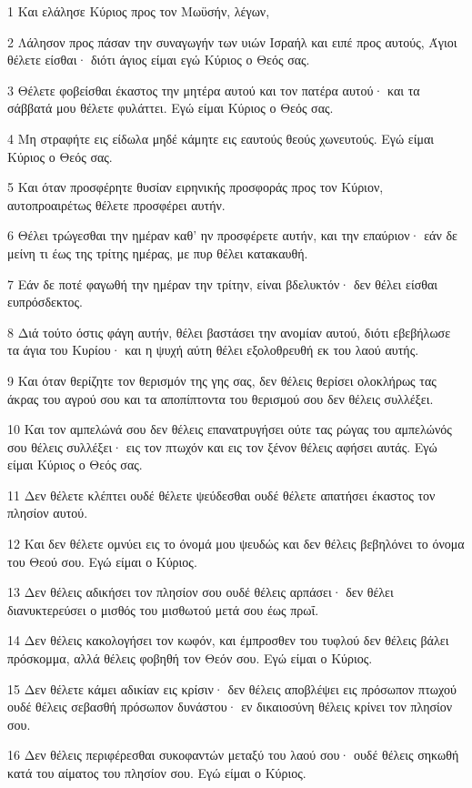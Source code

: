 \par 1 Και ελάλησε Κύριος προς τον Μωϋσήν, λέγων,
\par 2 Λάλησον προς πάσαν την συναγωγήν των υιών Ισραήλ και ειπέ προς αυτούς, Άγιοι θέλετε είσθαι· διότι άγιος είμαι εγώ Κύριος ο Θεός σας.
\par 3 Θέλετε φοβείσθαι έκαστος την μητέρα αυτού και τον πατέρα αυτού· και τα σάββατά μου θέλετε φυλάττει. Εγώ είμαι Κύριος ο Θεός σας.
\par 4 Μη στραφήτε εις είδωλα μηδέ κάμητε εις εαυτούς θεούς χωνευτούς. Εγώ είμαι Κύριος ο Θεός σας.
\par 5 Και όταν προσφέρητε θυσίαν ειρηνικής προσφοράς προς τον Κύριον, αυτοπροαιρέτως θέλετε προσφέρει αυτήν.
\par 6 Θέλει τρώγεσθαι την ημέραν καθ' ην προσφέρετε αυτήν, και την επαύριον· εάν δε μείνη τι έως της τρίτης ημέρας, με πυρ θέλει κατακαυθή.
\par 7 Εάν δε ποτέ φαγωθή την ημέραν την τρίτην, είναι βδελυκτόν· δεν θέλει είσθαι ευπρόσδεκτος.
\par 8 Διά τούτο όστις φάγη αυτήν, θέλει βαστάσει την ανομίαν αυτού, διότι εβεβήλωσε τα άγια του Κυρίου· και η ψυχή αύτη θέλει εξολοθρευθή εκ του λαού αυτής.
\par 9 Και όταν θερίζητε τον θερισμόν της γης σας, δεν θέλεις θερίσει ολοκλήρως τας άκρας του αγρού σου και τα αποπίπτοντα του θερισμού σου δεν θέλεις συλλέξει.
\par 10 Και τον αμπελώνά σου δεν θέλεις επανατρυγήσει ούτε τας ρώγας του αμπελώνός σου θέλεις συλλέξει· εις τον πτωχόν και εις τον ξένον θέλεις αφήσει αυτάς. Εγώ είμαι Κύριος ο Θεός σας.
\par 11 Δεν θέλετε κλέπτει ουδέ θέλετε ψεύδεσθαι ουδέ θέλετε απατήσει έκαστος τον πλησίον αυτού.
\par 12 Και δεν θέλετε ομνύει εις το όνομά μου ψευδώς και δεν θέλεις βεβηλόνει το όνομα του Θεού σου. Εγώ είμαι ο Κύριος.
\par 13 Δεν θέλεις αδικήσει τον πλησίον σου ουδέ θέλεις αρπάσει· δεν θέλει διανυκτερεύσει ο μισθός του μισθωτού μετά σου έως πρωΐ.
\par 14 Δεν θέλεις κακολογήσει τον κωφόν, και έμπροσθεν του τυφλού δεν θέλεις βάλει πρόσκομμα, αλλά θέλεις φοβηθή τον Θεόν σου. Εγώ είμαι ο Κύριος.
\par 15 Δεν θέλετε κάμει αδικίαν εις κρίσιν· δεν θέλεις αποβλέψει εις πρόσωπον πτωχού ουδέ θέλεις σεβασθή πρόσωπον δυνάστου· εν δικαιοσύνη θέλεις κρίνει τον πλησίον σου.
\par 16 Δεν θέλεις περιφέρεσθαι συκοφαντών μεταξύ του λαού σου· ουδέ θέλεις σηκωθή κατά του αίματος του πλησίον σου. Εγώ είμαι ο Κύριος.
